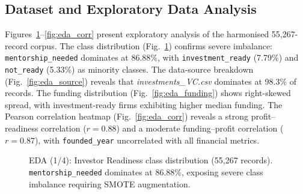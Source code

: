 \documentclass{article}
\begin{document}
\FloatBarrier
\subsection{Dataset and Exploratory Data Analysis}
\label{sec:eda}

Figures~\ref{fig:eda_class}--\ref{fig:eda_corr} present exploratory analysis
of the harmonised 55{,}267-record corpus.
The class distribution (Fig.~\ref{fig:eda_class}) confirms severe imbalance:
\texttt{mentorship\_needed} dominates at 86.88\%, with \texttt{investment\_ready}
(7.79\%) and \texttt{not\_ready} (5.33\%) as minority classes.
The data-source breakdown (Fig.~\ref{fig:eda_source}) reveals that
\textit{investments\_VC.csv} dominates at 98.3\% of records.
The funding distribution (Fig.~\ref{fig:eda_funding}) shows right-skewed spread,
with investment-ready firms exhibiting higher median funding.
The Pearson correlation heatmap (Fig.~\ref{fig:eda_corr}) reveals
a strong profit--readiness correlation ($r = 0.88$) and a moderate
funding--profit correlation ($r = 0.87$), with \texttt{founded\_year}
uncorrelated with all financial metrics.

\begin{figure}[htbp]
\centering
{}
\caption{EDA (1/4): Investor Readiness class distribution (55{,}267 records).
         \texttt{mentorship\_needed} dominates at 86.88\%, exposing severe
         class imbalance requiring SMOTE augmentation.}
\label{fig:eda_class}
\end{figure}
\end{document}
